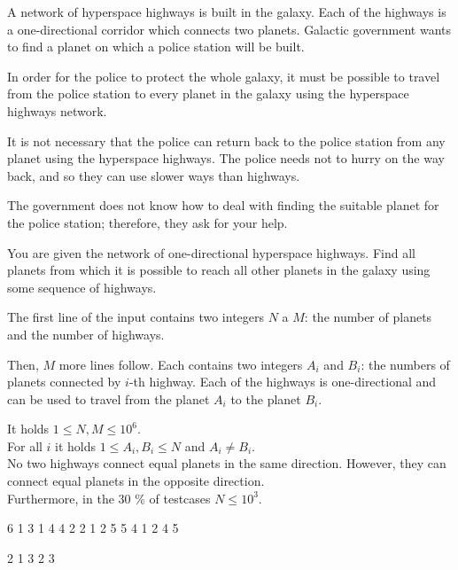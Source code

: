 





A network of hyperspace highways is built in the galaxy. Each of the highways
is a one-directional corridor which connects two planets. Galactic government
wants to find a planet on which a police station will be built.

In order for the police to protect the whole galaxy, it must be possible to
travel from the police station to every planet in the galaxy using the
hyperspace highways network.

It is not necessary that the police can return back to the police station from
any planet using the hyperspace highways. The police needs not to hurry on the
way back, and so they can use slower ways than highways.

The government does not know how to deal with finding the suitable planet for
the police station; therefore, they ask for your help.


You are given the network of one-directional hyperspace highways. Find all
planets from which it is possible to reach all other planets in the galaxy using
some sequence of highways.


The first line of the input contains two integers $N$ a $M$: the number of
planets and the number of highways.

Then, $M$ more lines follow. Each contains two integers $A_i$ and $B_i$: the
numbers of planets connected by $i$-th highway. Each of the highways is
one-directional and can be used to travel from the planet $A_i$ to the planet
$B_i$.

\bigskip
\noindent
It holds $1 \leq N, M \leq 10^6$.\\
For all $i$ it holds $1 \leq A_i, B_i \leq N$ and $A_i \neq B_i$.\\
No two highways connect equal planets in the same direction. However, they can
  connect equal planets in the opposite direction.\\
Furthermore, in the 30 \% of testcases $N \leq 10^3$.



 6
1 3
1 4
4 2
2 1
2 5
5 4
1 2 4 5
\sampleEND

 2
1 3
2 3
 
\sampleEND


